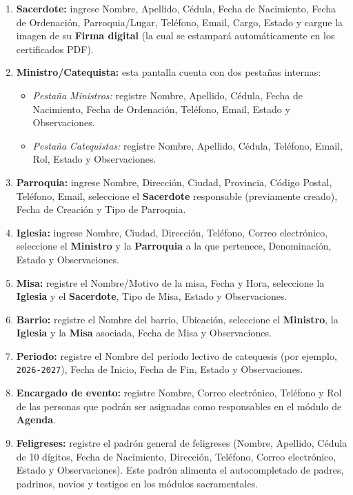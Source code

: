\begin{enumerate}
    \item \textbf{Sacerdote:} ingrese Nombre, Apellido, Cédula, Fecha de Nacimiento, Fecha de Ordenación, Parroquia/Lugar, Teléfono, Email, Cargo, Estado y cargue la imagen de su \textbf{Firma digital} (la cual se estampará automáticamente en los certificados PDF).
    \item \textbf{Ministro/Catequista:} esta pantalla cuenta con dos pestañas internas:
    \begin{itemize}
        \item \textit{Pestaña Ministros:} registre Nombre, Apellido, Cédula, Fecha de Nacimiento, Fecha de Ordenación, Teléfono, Email, Estado y Observaciones.
        \item \textit{Pestaña Catequistas:} registre Nombre, Apellido, Cédula, Teléfono, Email, Rol, Estado y Observaciones.
    \end{itemize}
    \item \textbf{Parroquia:} ingrese Nombre, Dirección, Ciudad, Provincia, Código Postal, Teléfono, Email, seleccione el \textbf{Sacerdote} responsable (previamente creado), Fecha de Creación y Tipo de Parroquia.
    \item \textbf{Iglesia:} ingrese Nombre, Ciudad, Dirección, Teléfono, Correo electrónico, seleccione el \textbf{Ministro} y la \textbf{Parroquia} a la que pertenece, Denominación, Estado y Observaciones.
    \item \textbf{Misa:} registre el Nombre/Motivo de la misa, Fecha y Hora, seleccione la \textbf{Iglesia} y el \textbf{Sacerdote}, Tipo de Misa, Estado y Observaciones.
    \item \textbf{Barrio:} registre el Nombre del barrio, Ubicación, seleccione el \textbf{Ministro}, la \textbf{Iglesia} y la \textbf{Misa} asociada, Fecha de Misa y Observaciones.
    \item \textbf{Periodo:} registre el Nombre del período lectivo de catequesis (por ejemplo, \texttt{2026-2027}), Fecha de Inicio, Fecha de Fin, Estado y Observaciones.
    \item \textbf{Encargado de evento:} registre Nombre, Correo electrónico, Teléfono y Rol de las personas que podrán ser asignadas como responsables en el módulo de \textbf{Agenda}.
    \item \textbf{Feligreses:} registre el padrón general de feligreses (Nombre, Apellido, Cédula de 10 dígitos, Fecha de Nacimiento, Dirección, Teléfono, Correo electrónico, Estado y Observaciones). Este padrón alimenta el autocompletado de padres, padrinos, novios y testigos en los módulos sacramentales.
\end{enumerate}

